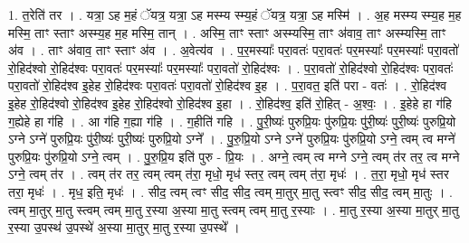 \documentclass[17pt]{extarticle}
\begin{document}
1. त॒रेति॑ तर । . यत्रा॒ ऽह म॒हं ॅयत्र॒ यत्रा॒ ऽह मस्म्य स्म्य॒हं ॅयत्र॒ यत्रा॒ ऽह मस्मि॑ । . अ॒ह मस्म्य स्म्य॒ह म॒ह मस्मि॒ ताꣳ स्ताꣳ अस्म्य॒ह म॒ह मस्मि॒ तान् । . अस्मि॒ ताꣳ स्ताꣳ अस्म्यस्मि॒ ताꣳ अ॑वाव॒ ताꣳ अस्म्यस्मि॒ ताꣳ अ॑व । . ताꣳ अ॑वाव॒ ताꣳ स्ताꣳ अ॑व । . अ॒वेत्य॑व । . प॒र॒मस्याः᳚ परा॒वतः॑ परा॒वतः॑ पर॒मस्याः᳚ पर॒मस्याः᳚ परा॒वतो॑ रो॒हिद॑श्वो रो॒हिद॑श्वः परा॒वतः॑ पर॒मस्याः᳚ पर॒मस्याः᳚ परा॒वतो॑ रो॒हिद॑श्वः । . प॒रा॒वतो॑ रो॒हिद॑श्वो रो॒हिद॑श्वः परा॒वतः॑ परा॒वतो॑ रो॒हिद॑श्व इ॒हेह रो॒हिद॑श्वः परा॒वतः॑ परा॒वतो॑ रो॒हिद॑श्व इ॒ह । . प॒रा॒वत॒ इति॑ परा - वतः॑ । . रो॒हिद॑श्व इ॒हेह रो॒हिद॑श्वो रो॒हिद॑श्व इ॒हेह रो॒हिद॑श्वो रो॒हिद॑श्व इ॒हा । . रो॒हिद॑श्व॒ इति॑ रो॒हित् - अ॒श्वः॒ । . इ॒हेहे हा ग॑हि ग॒ह्येहे हा ग॑हि । . आ ग॑हि ग॒ह्या ग॑हि । . ग॒हीति॑ गहि । . पु॒री॒ष्यः॑ पुरुप्रि॒यः पु॑रुप्रि॒यः पु॑री॒ष्यः॑ पुरी॒ष्यः॑ पुरुप्रि॒यो ऽग्ने ऽग्ने॑ पुरुप्रि॒यः पु॑री॒ष्यः॑ पुरी॒ष्यः॑ पुरुप्रि॒यो ऽग्ने᳚ । . पु॒रु॒प्रि॒यो ऽग्ने ऽग्ने॑ पुरुप्रि॒यः पु॑रुप्रि॒यो ऽग्ने॒ त्वम् त्व मग्ने॑ पुरुप्रि॒यः पु॑रुप्रि॒यो ऽग्ने॒ त्वम् । . पु॒रु॒प्रि॒य इति॑ पुरु - प्रि॒यः । . अग्ने॒ त्वम् त्व मग्ने ऽग्ने॒ त्वम् त॑र तर॒ त्व मग्ने ऽग्ने॒ त्वम् त॑र । . त्वम् त॑र तर॒ त्वम् त्वम् त॑रा॒ मृधो॒ मृध॑ स्तर॒ त्वम् त्वम् त॑रा॒ मृधः॑ । . त॒रा॒ मृधो॒ मृध॑ स्तर तरा॒ मृधः॑ । . मृध॒ इति॒ मृधः॑ । . सीद॒ त्वम् त्वꣳ सीद॒ सीद॒ त्वम् मा॒तुर् मा॒तु स्त्वꣳ सीद॒ सीद॒ त्वम् मा॒तुः । . त्वम् मा॒तुर् मा॒तु स्त्वम् त्वम् मा॒तु र॒स्या अ॒स्या मा॒तु स्त्वम् त्वम् मा॒तु र॒स्याः । . मा॒तु र॒स्या अ॒स्या मा॒तुर् मा॒तु र॒स्या उ॒पस्थ॑ उ॒पस्थे॑ अ॒स्या मा॒तुर् मा॒तु र॒स्या उ॒पस्थे᳚ । \newline
\end{document}
